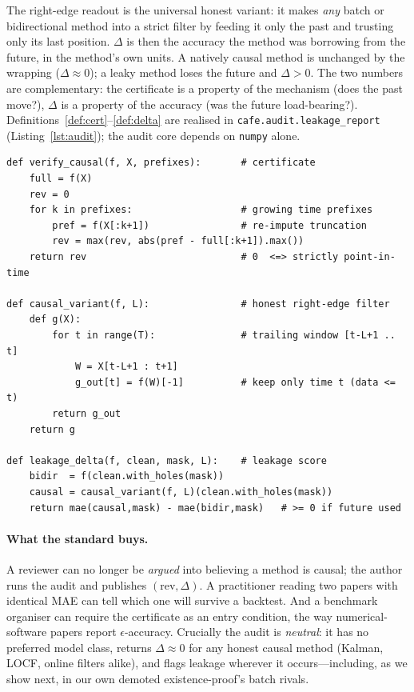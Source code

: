 \documentclass[10pt,twocolumn]{article}
\begin{document}
The right-edge readout is the universal honest variant: it makes \emph{any}
batch or bidirectional method into a strict filter by feeding it only the past
and trusting only its last position. $\Delta$ is then the accuracy the method was
borrowing from the future, in the method's own units. A natively causal method is
unchanged by the wrapping ($\Delta\approx0$); a leaky method loses the future and
$\Delta>0$. The two numbers are complementary: the certificate is a property of
the mechanism (does the past move?), $\Delta$ is a property of the accuracy (was
the future load-bearing?). Definitions~\ref{def:cert}--\ref{def:delta} are
realised in \texttt{cafe.audit.leakage\_report} (Listing~\ref{lst:audit}); the
audit core depends on \texttt{numpy} alone.

\begin{lstlisting}[style=algo,caption={The audit, in pseudocode (verbatim from the
reference implementation). Two model-agnostic numbers from any imputer.},
label={lst:audit},float=t]
def verify_causal(f, X, prefixes):       # certificate
    full = f(X)
    rev = 0
    for k in prefixes:                   # growing time prefixes
        pref = f(X[:k+1])                # re-impute truncation
        rev = max(rev, abs(pref - full[:k+1]).max())
    return rev                           # 0  <=> strictly point-in-time

def causal_variant(f, L):                # honest right-edge filter
    def g(X):
        for t in range(T):               # trailing window [t-L+1 .. t]
            W = X[t-L+1 : t+1]
            g_out[t] = f(W)[-1]          # keep only time t (data <= t)
        return g_out
    return g

def leakage_delta(f, clean, mask, L):    # leakage score
    bidir  = f(clean.with_holes(mask))
    causal = causal_variant(f, L)(clean.with_holes(mask))
    return mae(causal,mask) - mae(bidir,mask)   # >= 0 if future used
\end{lstlisting}

\paragraph{What the standard buys.} A reviewer can no longer be \emph{argued} into
believing a method is causal; the author runs the audit and publishes
$(\mathrm{rev},\Delta)$. A practitioner reading two papers with identical MAE can
tell which one will survive a backtest. And a benchmark organiser can require the
certificate as an entry condition, the way numerical-software papers report
$\epsilon$-accuracy. Crucially the audit is \emph{neutral}: it has no preferred
model class, returns $\Delta\approx0$ for any honest causal method (Kalman, LOCF,
online filters alike), and flags leakage wherever it occurs---including, as we
show next, in our own demoted existence-proof's batch rivals.
\end{document}
